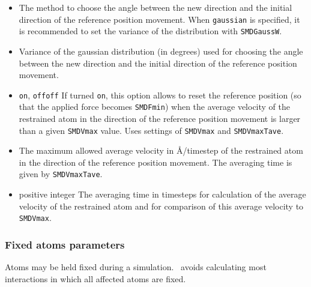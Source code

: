 \begin{itemize}
\item
{}
{The method to choose the angle between the new direction and the
initial direction of the reference position movement. When
\verb!gaussian! is specified, it is recommended to set the variance of
the distribution with \verb!SMDGaussW!.}

\item
{}
{Variance of the gaussian distribution (in degrees) used
for choosing the angle between the new direction and the
initial direction of the reference position movement.}


\item
{}
{\verb!on!, \verb!off!}{\verb!off!}
{If turned \verb!on!, this option allows to reset
the reference position (so that the applied force becomes
\verb!SMDFmin!) when the average velocity of the
restrained atom in the direction of the reference position movement is
larger than a given \verb!SMDVmax! value. Uses settings of 
\verb!SMDVmax! and \verb!SMDVmaxTave!.}

\item
{} {The maximum allowed average velocity in
\AA/timestep of the restrained atom in the direction of the reference
position movement. The averaging time is given by \verb!SMDVmaxTave!.}

\item
{}
{positive integer} {The averaging time in timesteps for calculation of
the average velocity of the restrained atom and for comparison of this
average velocity to
\verb!SMDVmax!.}
\end{itemize}

\subsubsection{Fixed atoms parameters}

Atoms may be held fixed during a simulation.  \NAMD\ avoids calculating most interactions in which all affected atoms are fixed.

